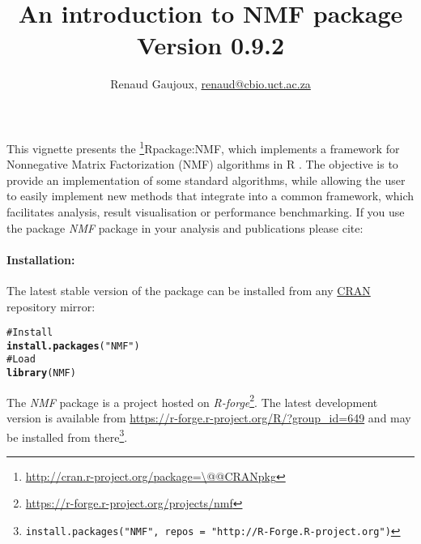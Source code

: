 \documentclass[a4paper]{article}\usepackage{graphicx, color}
\makeatletter
\newcommand{\hlfunctioncall}[1]{\textcolor[rgb]{0.501960784313725,0,0.329411764705882}{\textbf{#1}}}%
\newcommand{\hlstring}[1]{\textcolor[rgb]{0.6,0.6,1}{#1}}%
\newcommand{\hlcomment}[1]{\textcolor[rgb]{0.180392156862745,0.6,0.341176470588235}{#1}}%
\newenvironment{kframe}{%
 \def\at@end@of@kframe{}%
 \ifinner\ifhmode%
  \def\at@end@of@kframe{\end{minipage}}%
  \begin{minipage}{\columnwidth}%
 \fi\fi%
 \def\FrameCommand##1{\hskip\@totalleftmargin \hskip-\fboxsep
 \colorbox{shadecolor}{##1}\hskip-\fboxsep
     \hskip-\linewidth \hskip-\@totalleftmargin \hskip\columnwidth}%
 \MakeFramed {\advance\hsize-\width
   \@totalleftmargin\z@ \linewidth\hsize
   \@setminipage}}%
 {\par\unskip\endMakeFramed%
 \at@end@of@kframe}
\newenvironment{knitrout}{}{} %
\let\code=\texttt
\newcommand{\pkgname}[1]{\textit{#1}\xspace}
\newcommand{\Rpkg}[1]{\pkgname{#1} package\xspace}
\newcommand{\CRANurl}[1]{\url{http://cran.r-project.org/package=#1}}
\def\CRANpkg{\@ifstar\@CRANpkg\@@CRANpkg}
\def\@CRANpkg#1{\href{http://cran.r-project.org/package=#1}{\pkgname{#1}}\footnote{\CRANurl{#1}}}
\def\@@CRANpkg#1{\href{http://cran.r-project.org/package=#1}{\pkgname{#1}} package\footnote{\CRANurl{#1}}}
\def\citeCRANpkg{\@ifstar\@citeCRANpkg\@@citeCRANpkg}
\def\@citeCRANpkg#1{\CRANpkg{#1}\cite*{Rpackage:#1}}
\def\@@citeCRANpkg#1{\CRANpkg{#1}~\cite{Rpackage:#1}}
\newcommand{\nmfpack}{\Rpkg{NMF}}
\renewcommand{\cite}[1]{\parencite{#1}}
\makeatother
\begin{document}




\title{An introduction to NMF package\\\small Version
0.9.2}
\author{Renaud Gaujoux, \url{renaud@cbio.uct.ac.za}}

\maketitle

This vignette presents the \citeCRANpkg{NMF}, which implements a framework
for Nonnegative Matrix Factorization (NMF) algorithms in R \cite{R}.
The objective is to provide an implementation of some standard algorithms, while
allowing the user to easily implement new methods that integrate into a
common framework, which facilitates analysis, result visualisation or
performance benchmarking.
If you use the package \nmfpack in your analysis and publications please cite:

\bigskip
{}

\bigskip
\paragraph{Installation:} The latest stable version of the package can be installed from any
\href{http://cran.r-project.org}{CRAN} repository mirror:
\begin{knitrout}
\color{fgcolor}\begin{kframe}
\begin{alltt}
\hlcomment{# Install}
\hlfunctioncall{install.packages}(\hlstring{"NMF"})
\hlcomment{# Load}
\hlfunctioncall{library}(NMF)
\end{alltt}
\end{kframe}
\end{knitrout}

The \nmfpack is a project hosted on \emph{R-forge}\footnote{\url{https://r-forge.r-project.org/projects/nmf}}.
The latest development version is available from \url{https://r-forge.r-project.org/R/?group_id=649} and may be installed from there\footnote{\code{install.packages("NMF", repos = "http://R-Forge.R-project.org")}}.
\end{document}
